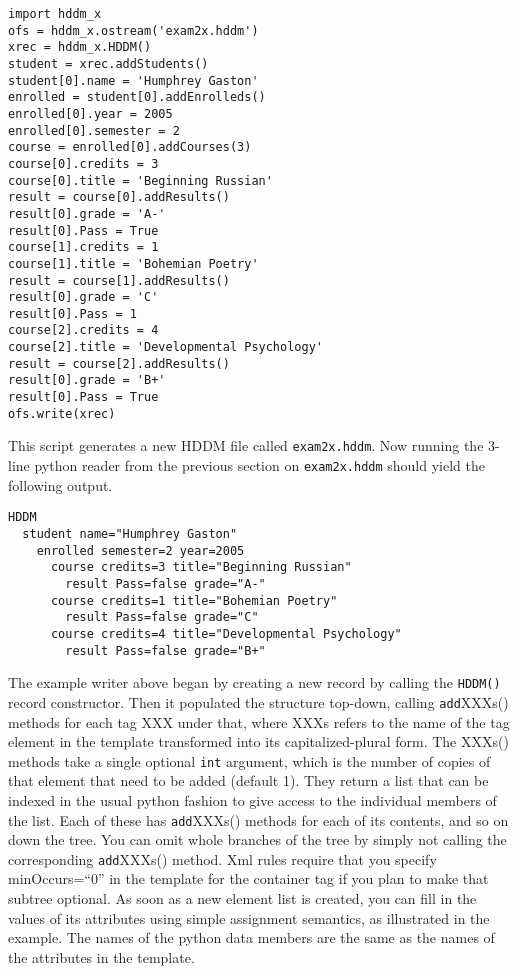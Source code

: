 \documentclass{revtex4}
\begin{document}
\vspace{0.5cm}
\begin{minipage}{12cm}
\begin{verbatim}
import hddm_x
ofs = hddm_x.ostream('exam2x.hddm')
xrec = hddm_x.HDDM()
student = xrec.addStudents()
student[0].name = 'Humphrey Gaston'
enrolled = student[0].addEnrolleds()
enrolled[0].year = 2005
enrolled[0].semester = 2
course = enrolled[0].addCourses(3)
course[0].credits = 3
course[0].title = 'Beginning Russian'
result = course[0].addResults()
result[0].grade = 'A-'
result[0].Pass = True
course[1].credits = 1
course[1].title = 'Bohemian Poetry'
result = course[1].addResults()
result[0].grade = 'C'
result[0].Pass = 1
course[2].credits = 4
course[2].title = 'Developmental Psychology'
result = course[2].addResults()
result[0].grade = 'B+'
result[0].Pass = True
ofs.write(xrec)
\end{verbatim}
\end{minipage}
\vspace{0.5cm}

This script generates a new HDDM file called \texttt{exam2x.hddm}. Now
running the 3-{}line python reader from the previous section on 
\texttt{exam2x.hddm} should yield the following output.

\vspace{0.5cm}
\begin{minipage}{12cm}
\begin{verbatim}
HDDM
  student name="Humphrey Gaston"
    enrolled semester=2 year=2005
      course credits=3 title="Beginning Russian"
        result Pass=false grade="A-"
      course credits=1 title="Bohemian Poetry"
        result Pass=false grade="C"
      course credits=4 title="Developmental Psychology"
        result Pass=false grade="B+"
\end{verbatim}
\end{minipage}
\vspace{0.5cm}

The example writer above began by creating a new record by calling
the \texttt{HDDM()} record constructor. Then it populated the structure
top-{}down, calling \texttt{add}XXXs() methods for each tag XXX under
that, where XXXs refers to the name of the tag element in the template
transformed into its capitalized-{}plural form. The XXXs()
methods take a single optional \texttt{int} argument, which
is the number of copies of that element that need to be added (default 1).
They return a list that can be indexed in the usual python fashion to give
access to the individual members of the list. Each of these has \texttt{add}XXXs()
methods for each of its contents, and so on down the tree. You can omit
whole branches of the tree by simply not calling the corresponding 
\texttt{add}XXXs() method. Xml rules require that you specify
minOccurs=``0'' in the template for the container tag if you plan to make that
subtree optional. As soon as a new element list is created, you can fill in the
values of its attributes using simple assignment semantics, as illustrated
in the example. The names of the python data members are the same as the
names of the attributes in the template.
\end{document}
